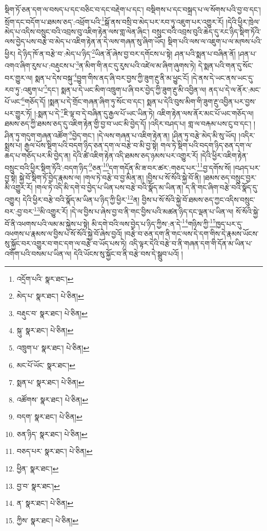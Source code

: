 སྡིག་ཏོ་ཅན་དག་ལ་བསད་པ་དང་བཅིང་བ་དང་བརྡེག་པ་དང་། བསྡིགས་པ་དང་བསྐྲད་པ་ལ་སོགས་པའི་བྱ་བ་དང་། སྲོག་དང་བདོག་པ་ཐམས་ཅད་:འཕྲོག་པའི་\footnote{འདྲོག་པའི་  སྣར་ཐང་། }སྒོ་ནས་བསྲི་བ་མེད་པར་རབ་ཏུ་འཇུག་པར་འགྱུར་རོ། །དེའི་ཕྱིར་ཁྲེལ་མེད་པ་འདིས་བསྲུང་བའི་འབྲས་བུ་འཇིག་རྟེན་ལས་གླ་ལེན་ཞིང་། བསྲུང་བའི་འབྲས་བུའི་ཆེད་དུ་རང་ཉིད་སྡིག་ཏོའི་ལས་བྱེད་པས་བརྩེ་བ་མེད་པ་འཇིག་རྟེན་ན་དེ་ལས་གཞན་སུ་ཞིག་ཡོད། སྡིག་པའི་ལས་ལ་འཇུག་པ་ལ་མཁས་པའི་ཕྱིར། དེ་ཉིད་ཁོ་ན་བརྩེ་བ་:མེད་པ་ཉིད་\footnote{མེད་པ་  སྣར་ཐང་།  པེ་ཅིན། }ཡིན་ནོ་ཞེས་བྱ་བར་དགོངས་པ་སྟེ། ཤན་པའི་སྨན་པ་བཞིན་ནོ། །ཤན་པ་འགའ་ཞིག་རུས་པ་:བརྡུངས་པ་\footnote{བརྡུང་བ་  སྣར་ཐང་།  པེ་ཅིན། }ན་མིག་གི་ནང་དུ་རུས་པའི་འཛེལ་མ་ཞིག་ཞུགས་ཏེ། དེ་སྨན་པའི་གན་དུ་སོང་བར་གྱུར་ལ། སྨན་པ་དེས་བསྐུ་\footnote{སྐུ་  སྣར་ཐང་།  པེ་ཅིན། }བྱུག་གིས་ནད་ཞི་བར་བྱས་ཀྱི་ཟུག་རྔུ་ནི་མ་ཕྱུང་ངོ། །དེ་ནས་དེ་ཡང་ནས་ཡང་དུ་རབ་ཏུ་:འཇུག་པ་\footnote{འཁྲུག་པ་  སྣར་ཐང་།  པེ་ཅིན། }དང་། སྨན་པ་དེ་ཡང་མིག་འཁྲུག་པ་ཞི་བར་བྱེད་ཀྱི་ཟུག་རྔུ་མི་འབྱིན་ལ། ནད་པ་དེ་ལ་ནོར་:མང་པོ་ཡང་\footnote{མང་པོ་ཡོང་  སྣར་ཐང་། }གཅོད་དོ། །སྨན་པ་དེ་གྲོང་གཞན་ཞིག་ཏུ་སོང་བ་དང་། སྨན་པ་དེའི་བུས་མིག་གི་ཟུག་རྔུ་འབྱིན་པར་བྱས་པར་གྱུར་ཏོ། །:སྨན་པ་དེ་\footnote{སྨན་པ་  སྣར་ཐང་།  པེ་ཅིན། }ཇི་ལྟ་བ་དེ་བཞིན་དུ་རྒྱལ་པོ་ཡང་ཡིན་ཏེ། འཇིག་རྟེན་ལས་ནོར་མང་པོ་ཡང་གཅོད་ལ། ཐམས་ཅད་ཀྱི་ཐམས་ཅད་དུ་འཇིག་རྟེན་གྱི་བྱ་བ་ཡང་མི་བྱེད་དོ། །འདིར་བཤད་པ། གླ་ལ་བརྐམ་པས་ངུ་བ་དང་། །ཤིན་ཏུ་གདུག་གཞན་འཚོག་\footnote{འཚོགས་  སྣར་ཐང་།  པེ་ཅིན། }བྱེད་གང་། །དེ་ལས་གཞན་པ་འཇིག་རྟེན་ན། །ཤིན་ཏུ་བརྩེ་མེད་མི་སུ་ཡོད། །འདིར་སྨྲས་པ། རྒྱལ་པོས་སྡིག་པའི་བདག་ཉིད་ཅན་དག་ལ་བརྩེ་བ་མི་བྱ་སྟེ། གལ་ཏེ་སྡིག་པའི་བདག་ཉིད་ཅན་དག་ལ་ཆད་པ་གཅོད་པར་མི་བྱེད་ན། དེའི་ཚེ་འཇིག་རྟེན་འདི་ཐམས་ཅད་ཉམས་པར་འགྱུར་རོ། །དེའི་ཕྱིར་འཇིག་རྟེན་བསྲུང་བའི་ཕྱིར་སྡིག་ཏོའི་:བདག་ཉིད་\footnote{བདག་  སྣར་ཐང་།  པེ་ཅིན། }ཅན་\footnote{ཅན་ཉིད་  སྣར་ཐང་།  པེ་ཅིན། }དག་གདོན་མི་ཟ་བར་ཚར་:གཅད་པར་\footnote{བཅད་པར་  སྣར་ཐང་།  པེ་ཅིན། }བྱ་དགོས་སོ། །བཤད་པར་བྱ་སྟེ། སྐྱེ་བོ་སྡིག་ཏོ་བྱེད་རྣམས་ལ། །གལ་ཏེ་བརྩེ་བ་བྱ་མིན་ན། །བྱིས་པ་སོ་སོའི་སྐྱེ་བོ་ནི། །ཐམས་ཅད་བསྲུང་བྱར་མི་འགྱུར་རོ། །གལ་ཏེ་འདི་མི་དགེ་བ་བྱེད་པ་ཡིན་པས་བརྩེ་བའི་སྣོད་མ་ཡིན་ན། ད་ནི་གང་ཞིག་བརྩེ་བའི་སྣོད་དུ་འགྱུར། དེའི་ཕྱིར་བརྩེ་བའི་སྣོད་མ་ཡིན་པ་ཉིད་ཀྱི་ཕྱིར་\footnote{ཕྱིན་  སྣར་ཐང་། }ན། བྱིས་པ་སོ་སོའི་སྐྱེ་བོ་ཐམས་ཅད་ཀྱང་འདིས་བསྲུང་བར་:བྱ་བར་\footnote{བྱ་བ་  སྣར་ཐང་། }མི་འགྱུར་རོ། །དེ་ལ་བྱིས་པ་ཞེས་བྱ་བ་ནི་གང་བྱིས་པའི་མཚན་ཉིད་དང་ལྡན་པ་ཡིན་ལ། སོ་སོའི་སྐྱེ་བོ་ནི་འཕགས་པའི་ལམ་མ་སྐྱེས་པ་སྟེ། མི་དགེ་བའི་ལས་བྱེད་པ་ཉིད་ཀྱིས་:ན་དེ་\footnote{ན་  སྣར་ཐང་།  པེ་ཅིན། }གཉིས་ཀྱི་\footnote{ཀྱིས་  སྣར་ཐང་།  པེ་ཅིན། }ཁྱད་པར་དུ་འཕགས་པ་རྣམས་ལ་བྱིས་པ་སོ་སོའི་སྐྱེ་བོ་ཞེས་བྱའོ། །བརྩེ་བ་ཅན་དག་ནི་གང་ལས་དེ་དག་གིས་དེ་རྣམས་ཡོངས་སུ་སྐྱོང་བར་འགྱུར་བ་གང་དག་ལ་བརྩེ་བ་ཡོད་པས་ཏེ། འདི་ལྟར་དེའི་བརྩེ་བ་ནི་གཞན་དག་གི་དོན་མ་ཡིན་པ་འགོག་པའི་བསམ་པ་ཡིན་ལ། དེའི་ཡོངས་སུ་སྐྱོང་བ་ནི་བརྩེ་བས་དེ་སྒྲུབ་པའོ། །
